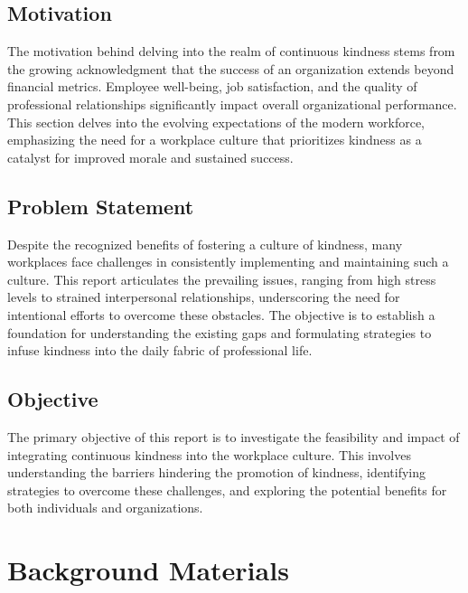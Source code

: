 \documentclass[a4paper, 11pt]{report}
\begin{document}
\subsection{Motivation}

The motivation behind delving into the realm of continuous kindness stems from the growing acknowledgment that the success of an organization extends beyond financial metrics. Employee well-being, job satisfaction, and the quality of professional relationships significantly impact overall organizational performance. This section delves into the evolving expectations of the modern workforce, emphasizing the need for a workplace culture that prioritizes kindness as a catalyst for improved morale and sustained success.

\subsection{Problem Statement}
Despite the recognized benefits of fostering a culture of kindness, many workplaces face challenges in consistently implementing and maintaining such a culture. This report articulates the prevailing issues, ranging from high stress levels to strained interpersonal relationships, underscoring the need for intentional efforts to overcome these obstacles. The objective is to establish a foundation for understanding the existing gaps and formulating strategies to infuse kindness into the daily fabric of professional life.

\subsection{Objective}
The primary objective of this report is to investigate the feasibility and impact of integrating continuous kindness into the workplace culture. This involves understanding the barriers hindering the promotion of kindness, identifying strategies to overcome these challenges, and exploring the potential benefits for both individuals and organizations.



\section{Background Materials}
\end{document}
